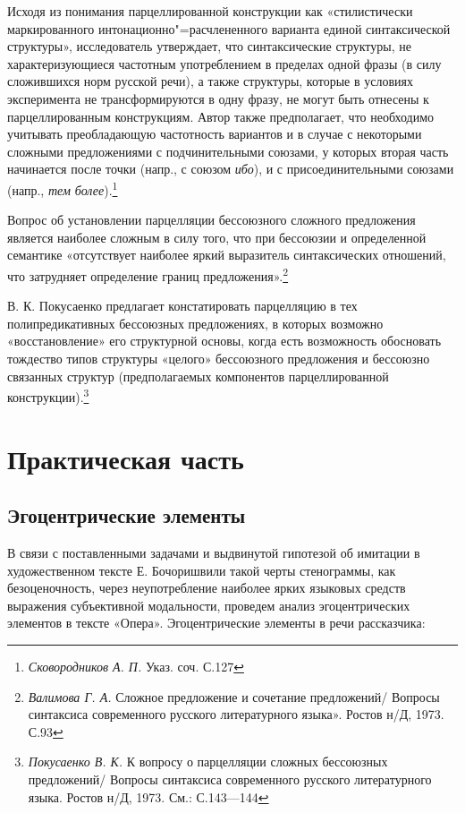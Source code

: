 \documentclass{kursa4}
\begin{document}
      {Исходя из понимания парцеллированной конструкции как «стилистически маркированного интонационно"=расчлененного варианта единой синтаксической структуры», исследователь утверждает, что синтаксические структуры, не характеризующиеся частотным употреблением в пределах одной фразы (в силу сложившихся норм русской речи), а также структуры, которые в условиях эксперимента не трансформируются в одну фразу, не могут быть отнесены к парцеллированным конструкциям. Автор также предполагает, что необходимо учитывать преобладающую частотность вариантов и в случае с некоторыми сложными предложениями с подчинительными союзами, у которых вторая часть начинается после точки (напр., с союзом }\textit{{ибо}}{), и с присоединительными союзами (напр., }\textit{{тем более}}{).}\footnote{\textit{{ Сковородников А. П. }}{Указ. соч. С.127}}

      {Вопрос об установлении парцелляции бессоюзного сложного предложения является наиболее сложным в силу того, что при бессоюзии и определенной семантике «отсутствует наиболее яркий выразитель синтаксических отношений, что затрудняет определение границ предложения».}\footnote{{ }\textit{{Валимова Г. А. }}{Сложное предложение и сочетание предложений/ Вопросы синтаксиса современного русского литературного языка». Ростов н/Д, 1973. С.93}}

      {В. К. Покусаенко предлагает констатировать парцелляцию в тех полипредикативных бессоюзных предложениях, в которых возможно «восстановление» его структурной основы, когда есть возможность обосновать тождество типов структуры «целого» бессоюзного предложения и бессоюзно связанных структур (предполагаемых компонентов парцеллированной конструкции).}\footnote{{ }\textit{{Покусаенко В. К. }}{К вопросу о парцелляции сложных бессоюзных предложений/ Вопросы синтаксиса современного русского литературного языка. Ростов н/Д, 1973. См.: С.143—144}}

  \chapter{Практическая часть}

    \section{Эгоцентрические элементы}

      В связи с поставленными задачами и выдвинутой гипотезой об имитации в художественном тексте Е. Бочоришвили такой черты стенограммы, как безоценочность, через неупотребление наиболее ярких языковых средств выражения субъективной модальности, проведем анализ эгоцентрических элементов в тексте «Опера». Эгоцентрические элементы в речи рассказчика:
\end{document}
